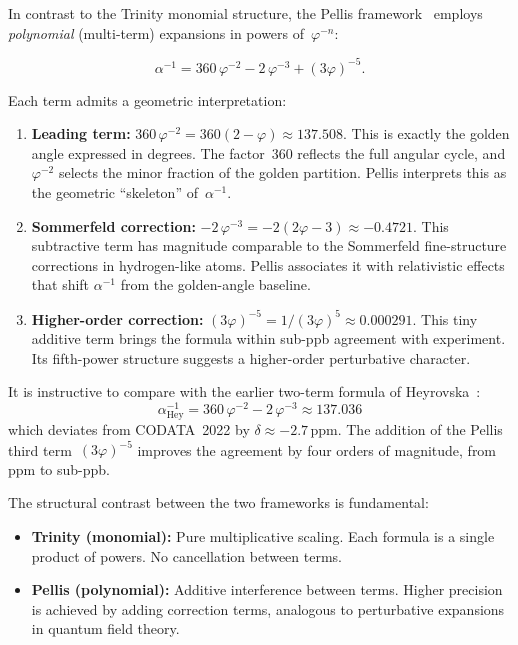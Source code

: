 \documentclass[11pt,a4paper]{article}
\newcommand{\vp}{\varphi}
\newcommand{\ppm}{\,\mathrm{ppm}}
\begin{document}
In contrast to the Trinity monomial structure, the Pellis
framework~\cite{pellis2021alpha,pellis2023toe} employs \emph{polynomial}
(multi-term) expansions in powers of~$\vp^{-n}$:

\begin{equation}
  \alpha^{-1} = 360\,\vp^{-2} - 2\,\vp^{-3} + (3\vp)^{-5}.
  \label{eq:pellis}
\end{equation}

Each term admits a geometric interpretation:
\begin{enumerate}[leftmargin=*]
\item \textbf{Leading term:} $360\,\vp^{-2} = 360(2-\vp) \approx 137.508$.
This is exactly the golden angle expressed in degrees. The factor~360
reflects the full angular cycle, and $\vp^{-2}$ selects the minor
fraction of the golden partition. Pellis interprets this as the geometric
``skeleton'' of~$\alpha^{-1}$.

\item \textbf{Sommerfeld correction:}
$-2\,\vp^{-3} = -2(2\vp-3) \approx -0.4721$. This subtractive term has
magnitude comparable to the Sommerfeld fine-structure corrections in
hydrogen-like atoms. Pellis associates it with relativistic effects that
shift $\alpha^{-1}$ from the golden-angle baseline.

\item \textbf{Higher-order correction:}
$(3\vp)^{-5} = 1/(3\vp)^{5} \approx 0.000291$. This tiny additive term
brings the formula within sub-ppb agreement with experiment. Its fifth-power
structure suggests a higher-order perturbative character.
\end{enumerate}

It is instructive to compare with the earlier two-term formula of
Heyrovska~\cite{heyrovska2005}:
\begin{equation}
  \alpha^{-1}_{\mathrm{Hey}} = 360\,\vp^{-2} - 2\,\vp^{-3} \approx 137.036
  \label{eq:heyrovska}
\end{equation}
which deviates from CODATA~2022 by $\delta\approx -2.7\ppm$. The addition of
the Pellis third term~$(3\vp)^{-5}$ improves the agreement by four orders of
magnitude, from ppm to sub-ppb.

The structural contrast between the two frameworks is fundamental:
\begin{itemize}
\item \textbf{Trinity (monomial):} Pure multiplicative scaling. Each formula is
a single product of powers. No cancellation between terms.
\item \textbf{Pellis (polynomial):} Additive interference between terms. Higher
precision is achieved by adding correction terms, analogous to perturbative
expansions in quantum field theory.
\end{itemize}
\end{document}
